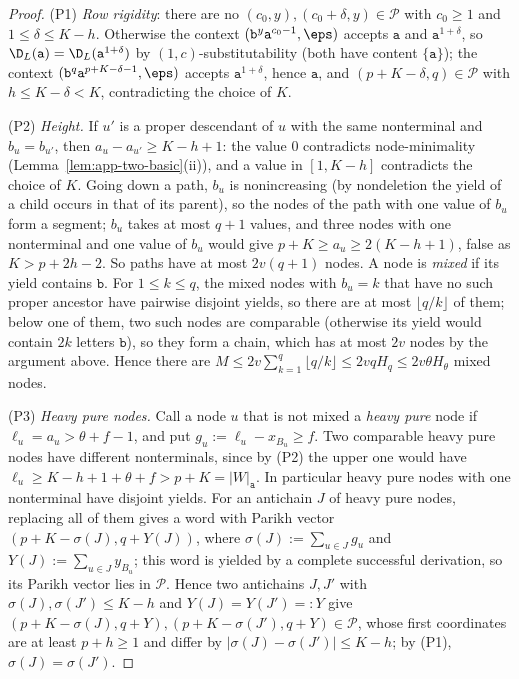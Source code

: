 \begin{proof}
(P1) \emph{Row rigidity}: there are no $(c_0,y),(c_0+\delta,y)\in\mathcal P$ with
$c_0\ge1$ and $1\le\delta\le K-h$.  Otherwise the context
$(\mathtt b^y\mathtt a^{c_0-1},\eps)$ accepts $\mathtt a$ and $\mathtt a^{1+\delta}$, so
$\D_L(\mathtt a)=\D_L(\mathtt a^{1+\delta})$ by $(1,c)$-substitutability (both have
content $\{\mathtt a\}$); the context $(\mathtt b^q\mathtt a^{p+K-\delta-1},\eps)$ accepts
$\mathtt a^{1+\delta}$, hence $\mathtt a$, and $(p+K-\delta,q)\in\mathcal P$ with
$h\le K-\delta<K$, contradicting the choice of $K$.

(P2) \emph{Height.}  If $u'$ is a proper descendant of $u$ with the same
nonterminal and $b_u=b_{u'}$, then $a_u-a_{u'}\ge K-h+1$: the value $0$
contradicts node-minimality (Lemma~\ref{lem:app-two-basic}(ii)), and a value in
$[1,K-h]$ contradicts the choice of $K$.  Going down a path, $b_u$ is
nonincreasing (by nondeletion the yield of a child occurs in that of its parent),
so the nodes of the path with one value of $b_u$ form a segment; $b_u$ takes at most $q+1$
values, and three nodes with one nonterminal and one value of $b_u$ would give
$p+K\ge a_u\ge2(K-h+1)$, false as $K>p+2h-2$.  So paths have at most $2v(q+1)$
nodes.  A node is \emph{mixed} if its yield contains $\mathtt b$.  For
$1\le k\le q$, the mixed nodes with $b_u=k$ that have no such proper ancestor have
pairwise disjoint yields, so there are at most $\lfloor q/k\rfloor$ of them; below
one of them, two such nodes are comparable (otherwise its yield would contain $2k$
letters $\mathtt b$), so they form a chain, which has at most $2v$ nodes by the
argument above.  Hence there are
$M\le2v\sum_{k=1}^q\lfloor q/k\rfloor\le2vqH_q\le2v\theta H_\theta$ mixed nodes.

(P3) \emph{Heavy pure nodes.}  Call a node $u$ that is not mixed a
\emph{heavy pure} node if $\ell_u=a_u>\theta+f-1$, and put
$g_u:=\ell_u-x_{B_u}\ge f$.  Two comparable heavy pure nodes have different
nonterminals, since by (P2) the upper one would have
$\ell_u\ge K-h+1+\theta+f>p+K=|W|_{\mathtt a}$.  In particular heavy pure nodes with
one nonterminal have disjoint yields.  For an antichain $J$ of heavy pure nodes,
replacing all of them gives a word with Parikh vector $(p+K-\sigma(J),q+Y(J))$,
where $\sigma(J):=\sum_{u\in J}g_u$ and $Y(J):=\sum_{u\in J}y_{B_u}$; this word is yielded by a complete successful derivation, so its Parikh vector
lies in $\mathcal P$.  Hence two antichains $J,J'$ with
$\sigma(J),\sigma(J')\le K-h$ and $Y(J)=Y(J')=:Y$ give
$(p+K-\sigma(J),q+Y),(p+K-\sigma(J'),q+Y)\in\mathcal P$, whose first coordinates
are at least $p+h\ge1$ and differ by $|\sigma(J)-\sigma(J')|\le K-h$; by (P1),
$\sigma(J)=\sigma(J')$.


\end{proof}
